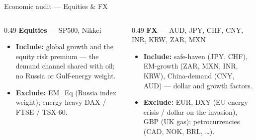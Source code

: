 \documentclass[aspectratio=169,11pt]{beamer}
\newcommand{\smalltext}[1]{{\footnotesize\textcolor{muted}{#1}}}
\newcommand{\hd}[1]{\textbf{#1}}
\begin{document}
\begin{frame}{Economic audit --- Equities \& FX}
  \footnotesize
  \begin{columns}[T]
    \begin{column}{0.49\textwidth}
      \hd{Equities} \smalltext{--- SP500, Nikkei}
      \begin{itemize}\setlength\itemsep{0.4em}
        \item \hd{Include:} global growth and the equity risk premium --- the demand channel shared with oil;
          no Russia or Gulf-energy weight.
        \item \hd{Exclude:} EM\_Eq (Russia index weight); energy-heavy DAX / FTSE / TSX-60.
      \end{itemize}
    \end{column}
    \begin{column}{0.49\textwidth}
      \hd{FX} \smalltext{--- AUD, JPY, CHF, CNY, INR, KRW, ZAR, MXN}
      \begin{itemize}\setlength\itemsep{0.4em}
        \item \hd{Include:} safe-haven (JPY, CHF), EM-growth (ZAR, MXN, INR, KRW), China-demand (CNY, AUD)
          --- dollar and growth factors.
        \item \hd{Exclude:} EUR, DXY (EU energy-crisis / dollar on the invasion), GBP (UK gas);
          petrocurrencies (CAD, NOK, BRL, \dots).
      \end{itemize}
    \end{column}
  \end{columns}
\end{frame}
\end{document}
